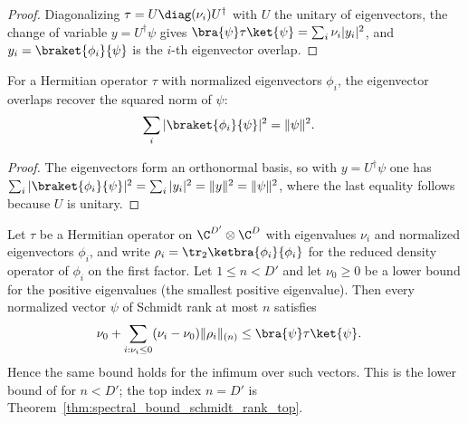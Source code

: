 \begin{proof}
    \leanok
    Diagonalizing $\tau=U\diag(\nu_i)U^\dagger$ with $U$ the unitary of
    eigenvectors, the change of variable $y=U^\dagger\psi$ gives
    $\bra{\psi}\tau\ket{\psi}=\sum_i\nu_i|y_i|^2$, and
    $y_i=\braket{\phi_i}{\psi}$ is the $i$-th eigenvector overlap.
\end{proof}

\begin{lemma}
    \label{lem:eigenbasis_parseval}
    \leanok
    For a Hermitian operator $\tau$ with normalized eigenvectors $\phi_i$, the
    eigenvector overlaps recover the squared norm of $\psi$:
    \begin{align}
        \sum_i|\braket{\phi_i}{\psi}|^2
         & =\|\psi\|^2.
        \label{eq:schwarz_eigenbasis_parseval}
    \end{align}
\end{lemma}

\begin{proof}
    \leanok
    The eigenvectors form an orthonormal basis, so with $y=U^\dagger\psi$ one
    has
    $\sum_i|\braket{\phi_i}{\psi}|^2=\sum_i|y_i|^2=\|y\|^2=\|\psi\|^2$,
    where the last equality follows because $U$ is unitary.
\end{proof}

\begin{theorem}
    \label{thm:spectral_lower_bound_schmidt_rank}
    \leanok
    Let $\tau$ be a Hermitian operator on $\C^{D'}\otimes\C^{D}$ with
    eigenvalues $\nu_i$ and normalized eigenvectors $\phi_i$, and write
    $\rho_i=\tr_2\ketbra{\phi_i}{\phi_i}$ for the reduced density operator of
    $\phi_i$ on the first factor. Let $1\le n<D'$ and let $\nu_0\ge 0$ be a
    lower bound for the positive eigenvalues (the smallest positive
    eigenvalue). Then every normalized vector $\psi$ of Schmidt rank at most
    $n$ satisfies
    \begin{align}
        \nu_0+\sum_{i:\nu_i\le0}
        (\nu_i-\nu_0)\|\rho_i\|_{(n)}
         & \le\bra{\psi}\tau\ket{\psi}.
        \label{eq:schwarz_spectral_schmidt_lower}
    \end{align}
    Hence the same bound holds for the infimum over such vectors. This is the
    lower bound of \cite[Chapter~3, Proposition~3.2]{Wolf2012Quantum} for
    $n<D'$; the top index $n=D'$ is
    Theorem~\ref{thm:spectral_bound_schmidt_rank_top}.
\end{theorem}

